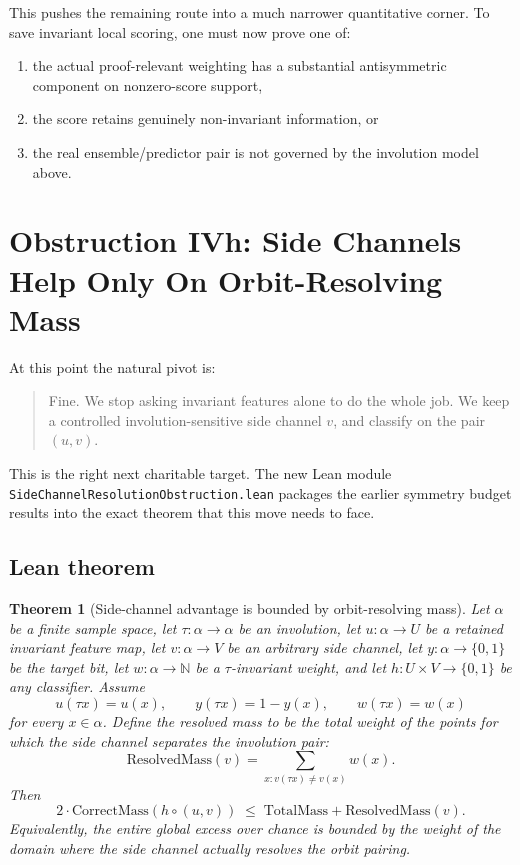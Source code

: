 \documentclass[11pt]{article}
\newtheorem{theorem}{Theorem}[section]
\theoremstyle{remark}
\begin{document}
This pushes the remaining route into a much narrower quantitative corner.  To save invariant local
scoring, one must now prove one of:
\begin{enumerate}[leftmargin=1.5em]
  \item the actual proof-relevant weighting has a substantial antisymmetric component on
  nonzero-score support,
  \item the score retains genuinely non-invariant information, or
  \item the real ensemble/predictor pair is not governed by the involution model above.
\end{enumerate}

\section{Obstruction IVh: Side Channels Help Only On Orbit-Resolving Mass}

At this point the natural pivot is:
\begin{quote}
Fine.  We stop asking invariant features alone to do the whole job.  We keep a controlled
involution-sensitive side channel \(v\), and classify on the pair \((u,v)\).
\end{quote}

This is the right next charitable target.  The new Lean module
\texttt{SideChannelResolutionObstruction.lean} packages the earlier symmetry budget results into the
exact theorem that this move needs to face.

\subsection{Lean theorem}

\begin{theorem}[Side-channel advantage is bounded by orbit-resolving mass]
Let \(\alpha\) be a finite sample space, let \(\tau : \alpha \to \alpha\) be an involution, let
\(u : \alpha \to U\) be a retained invariant feature map, let \(v : \alpha \to V\) be an arbitrary
side channel, let \(y : \alpha \to \{0,1\}\) be the target bit, let \(w : \alpha \to \mathbb{N}\)
be a \(\tau\)-invariant weight, and let \(h : U \times V \to \{0,1\}\) be any classifier.  Assume
\[
  u(\tau x) = u(x), \qquad y(\tau x) = 1-y(x), \qquad w(\tau x) = w(x)
\]
for every \(x \in \alpha\).  Define the \emph{resolved mass} to be the total weight of the points
for which the side channel separates the involution pair:
\[
  \mathrm{ResolvedMass}(v)
  =
  \sum_{x : v(\tau x) \neq v(x)} w(x).
\]
Then
\[
  2 \cdot \mathrm{CorrectMass}(h \circ (u,v))
  \;\le\;
  \mathrm{TotalMass} + \mathrm{ResolvedMass}(v).
\]
Equivalently, the entire global excess over chance is bounded by the weight of the domain where the
side channel actually resolves the orbit pairing.
\end{theorem}
\end{document}
